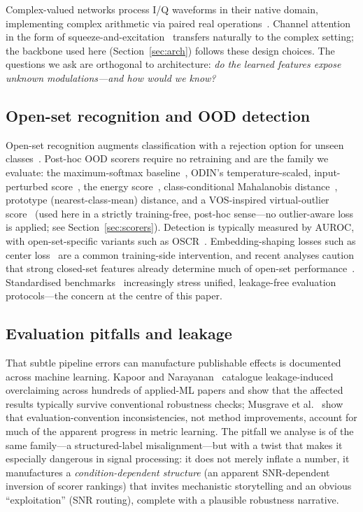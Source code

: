 \documentclass[review,12pt]{elsarticle}
\begin{document}
Complex-valued networks process I/Q waveforms in their native domain,
implementing complex arithmetic via paired real
operations~\cite{trabelsi2018complex,lee2022complex}. Channel attention
in the form of squeeze-and-excitation~\cite{hu2018senet} transfers
naturally to the complex setting; the backbone used here
(Section~\ref{sec:arch}) follows these design choices. The questions we
ask are orthogonal to architecture: \emph{do the learned features
expose unknown modulations---and how would we know?}

\subsection{Open-set recognition and OOD detection}

Open-set recognition augments classification with a rejection option
for unseen classes~\cite{scheirer2013open,bendale2016openmax}. Post-hoc
OOD scorers require no retraining and are the family we evaluate: the
maximum-softmax baseline~\cite{hendrycks2017msp}, ODIN's
temperature-scaled, input-perturbed score~\cite{liang2018odin}, the
energy score~\cite{liu2020energy}, class-conditional Mahalanobis
distance~\cite{lee2018mahalanobis}, prototype (nearest-class-mean)
distance, and a VOS-inspired virtual-outlier score~\cite{du2022vos}
(used here in a strictly training-free, post-hoc sense---no
outlier-aware loss is applied; see Section~\ref{sec:scorers}).
Detection is typically measured by AUROC, with open-set-specific
variants such as OSCR~\cite{dhamija2018oscr}. Embedding-shaping losses
such as center loss~\cite{wen2016center} are a common training-side
intervention, and recent analyses caution that strong closed-set
features already determine much of open-set
performance~\cite{vaze2022open}. Standardised
benchmarks~\cite{yang2022openood} increasingly stress unified,
leakage-free evaluation protocols---the concern at the centre of this
paper.

\subsection{Evaluation pitfalls and leakage}

That subtle pipeline errors can manufacture publishable effects is
documented across machine learning. Kapoor and
Narayanan~\cite{kapoor2023leakage} catalogue leakage-induced
overclaiming across hundreds of applied-ML papers and show that the
affected results typically survive conventional robustness checks;
Musgrave et al.~\cite{musgrave2020reality} show that evaluation-convention
inconsistencies, not method improvements, account for much of the
apparent progress in metric learning. The pitfall we analyse is of the
same family---a structured-label misalignment---but with a twist that
makes it especially dangerous in signal processing: it does not merely
inflate a number, it manufactures a \emph{condition-dependent
structure} (an apparent SNR-dependent inversion of scorer rankings)
that invites mechanistic storytelling and an obvious ``exploitation''
(SNR routing), complete with a plausible robustness narrative.
\end{document}
